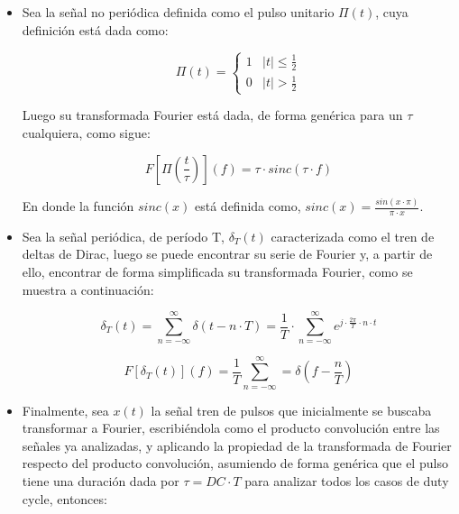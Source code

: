 \begin{itemize}
    \item Sea la se\~nal no peri\'odica definida como el pulso unitario $\Pi(t)$, cuya definici\'on est\'a dada como:
    
    \begin{equation}
        \Pi(t) = \begin{cases}
            1 & |t| \leq \frac{1}{2} \\
            0 & |t| > \frac{1}{2} 
        \end{cases}
        \label{eq:definicion_pulso_unitario}
    \end{equation}
    
    Luego su transformada Fourier est\'a dada, de forma gen\'erica para un $\tau$ cualquiera, como sigue:
    
    \begin{equation}
        F \left[ \Pi(\frac{t}{\tau}) \right] (f) = \tau \cdot sinc(\tau \cdot f)
        \label{eq:transformada_pulso_unitario}
    \end{equation}
    
    En donde la funci\'on $sinc(x)$ est\'a definida como, $sinc(x) = \frac{sin(x \cdot \pi)}{\pi \cdot x}$.
    
    \item Sea la se\~nal peri\'odica, de per\'iodo T, $\delta_T(t)$ caracterizada como el tren de deltas de Dirac, luego se puede encontrar su serie de Fourier
    y, a partir de ello, encontrar de forma simplificada su transformada Fourier, como se muestra a continuaci\'on:

    \begin{equation}
        \delta_T(t) = \sum_{n = - \infty}^{\infty} \delta(t - n \cdot T) = \frac{1}{T} \cdot \sum_{n = -\infty}^{\infty} e^{j \cdot \frac{2 \pi}{T} \cdot n \cdot t}
        \label{eq:definicion_tren_deltas}
    \end{equation}

    \begin{equation}
        F \left[ \delta_T(t) \right](f) = \frac{1}{T} \sum_{n=-\infty}^{\infty} = \delta(f - \frac{n}{T})
        \label{eq:transformada_tren_deltas}
    \end{equation}

    \item Finalmente, sea $x(t)$ la se\~nal tren de pulsos que inicialmente se buscaba transformar a Fourier, escribi\'endola como el producto convoluci\'on
    entre las se\~nales ya analizadas, y aplicando la propiedad de la transformada de Fourier respecto del producto convoluci\'on, asumiendo de forma gen\'erica
    que el pulso tiene una duraci\'on dada por $\tau = DC \cdot T$ para analizar todos los casos de duty cycle, entonces:


\end{itemize}
